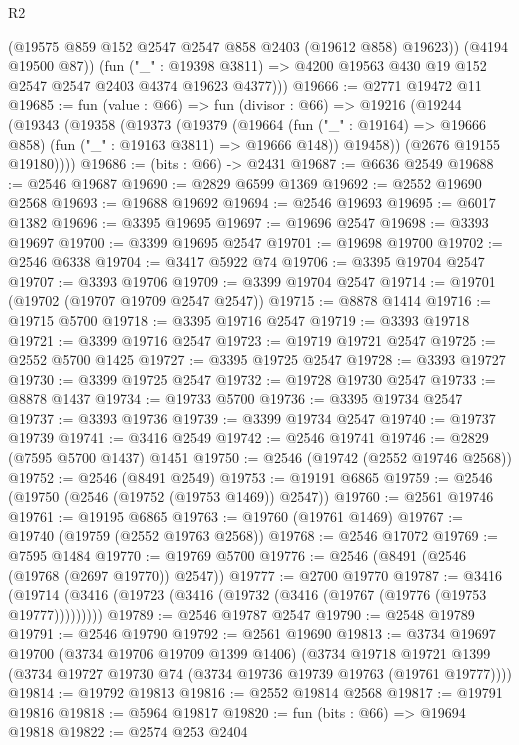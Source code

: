 \begin{lexlean}{R2}
\begin{coremodule}
            (@19575 @859 @152 @2547 @2547 @858 @2403 (@19612 @858) @19623))
          (@4194 @19500 @87))
        (fun ("_" : @19398 @3811) =>
        @4200 @19563 @430 @19 @152 @2547 @2547 @2403 @4374 @19623 @4377)))
@19666 := @2771 @19472 @11
@19685 := fun (value : @66) =>
  fun (divisor : @66) =>
  @19216
    (@19244
      (@19343
        (@19358
          (@19373
            (@19379
              (@19664 (fun ("_" : @19164) => @19666 @858) (fun ("_" : @19163 @3811) => @19666 @148))
              @19458))
          (@2676 @19155 @19180))))
@19686 := (bits : @66) -> @2431
@19687 := @6636 @2549
@19688 := @2546 @19687
@19690 := @2829 @6599 @1369
@19692 := @2552 @19690 @2568
@19693 := @19688 @19692
@19694 := @2546 @19693
@19695 := @6017 @1382
@19696 := @3395 @19695
@19697 := @19696 @2547
@19698 := @3393 @19697
@19700 := @3399 @19695 @2547
@19701 := @19698 @19700
@19702 := @2546 @6338
@19704 := @3417 @5922 @74
@19706 := @3395 @19704 @2547
@19707 := @3393 @19706
@19709 := @3399 @19704 @2547
@19714 := @19701 (@19702 (@19707 @19709 @2547 @2547))
@19715 := @8878 @1414
@19716 := @19715 @5700
@19718 := @3395 @19716 @2547
@19719 := @3393 @19718
@19721 := @3399 @19716 @2547
@19723 := @19719 @19721 @2547
@19725 := @2552 @5700 @1425
@19727 := @3395 @19725 @2547
@19728 := @3393 @19727
@19730 := @3399 @19725 @2547
@19732 := @19728 @19730 @2547
@19733 := @8878 @1437
@19734 := @19733 @5700
@19736 := @3395 @19734 @2547
@19737 := @3393 @19736
@19739 := @3399 @19734 @2547
@19740 := @19737 @19739
@19741 := @3416 @2549
@19742 := @2546 @19741
@19746 := @2829 (@7595 @5700 @1437) @1451
@19750 := @2546 (@19742 (@2552 @19746 @2568))
@19752 := @2546 (@8491 @2549)
@19753 := @19191 @6865
@19759 := @2546 (@19750 (@2546 (@19752 (@19753 @1469)) @2547))
@19760 := @2561 @19746
@19761 := @19195 @6865
@19763 := @19760 (@19761 @1469)
@19767 := @19740 (@19759 (@2552 @19763 @2568))
@19768 := @2546 @17072
@19769 := @7595 @1484
@19770 := @19769 @5700
@19776 := @2546 (@8491 (@2546 (@19768 (@2697 @19770)) @2547))
@19777 := @2700 @19770
@19787 := @3416 (@19714 (@3416 (@19723 (@3416 (@19732 (@3416 (@19767 (@19776 (@19753 @19777)))))))))
@19789 := @2546 @19787 @2547
@19790 := @2548 @19789
@19791 := @2546 @19790
@19792 := @2561 @19690
@19813 := @3734
    @19697
    @19700
    (@3734 @19706 @19709 @1399 @1406)
    (@3734
      @19718
      @19721
      @1399
      (@3734 @19727 @19730 @74 (@3734 @19736 @19739 @19763 (@19761 @19777))))
@19814 := @19792 @19813
@19816 := @2552 @19814 @2568
@19817 := @19791 @19816
@19818 := @5964 @19817
@19820 := fun (bits : @66) => @19694 @19818
@19822 := @2574 @253 @2404

\end{coremodule}
\end{lexlean}
